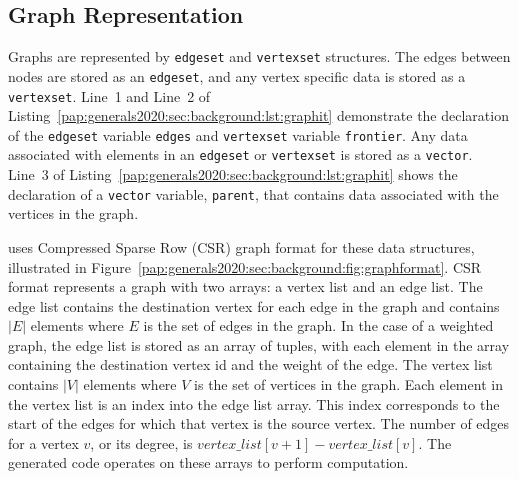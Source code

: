 \subsection{Graph Representation}
Graphs are represented by \lstinline[language=graphit]{edgeset} and \lstinline[language=graphit]{vertexset} structures.
The edges between nodes are stored as an \lstinline[language=graphit]{edgeset}, and any vertex specific data is stored as a \lstinline[language=graphit]{vertexset}.
Line~1 and Line~2 of Listing~\ref{pap:generals2020:sec:background:lst:graphit} demonstrate the declaration of the \lstinline[language=graphit]{edgeset} variable \lstinline[language=graphit]{edges} and  \lstinline[language=graphit]{vertexset} variable \lstinline[language=graphit]{frontier}. 
Any data associated with elements in an \lstinline[language=graphit]{edgeset} or \lstinline[language=graphit]{vertexset} is stored as a \lstinline[language=graphit]{vector}.
Line~3 of Listing~\ref{pap:generals2020:sec:background:lst:graphit} shows the declaration of a \lstinline[language=graphit]{vector} variable, \lstinline[language=graphit]{parent}, that contains data associated with the vertices in the graph.

\graphit uses Compressed Sparse Row (CSR) graph format for these data structures, illustrated in Figure~\ref{pap:generals2020:sec:background:fig:graphformat}.
CSR format represents a graph with two arrays: a vertex list and an edge list.
The edge list contains the destination vertex for each edge in the graph and contains $|E|$ elements where $E$ is the set of edges in the graph.
In the case of a weighted graph, the edge list is stored as an array of tuples, with each element in the array containing the destination vertex id and the weight of the edge.
The vertex list contains $|V|$ elements where $V$ is the set of vertices in the graph. 
Each element in the vertex list is an index into the edge list array.
This index corresponds to the start of the edges for which that vertex is the source vertex.
The number of edges for a vertex $v$, or its degree, is $vertex\_list[v+1] - vertex\_list[v]$.
The generated code operates on these arrays to perform computation.

\graphformatfig


